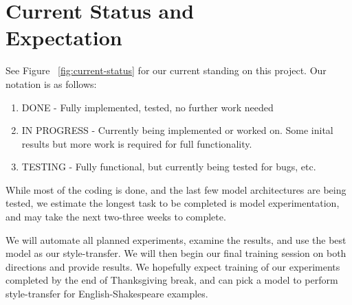 \documentclass[twoside,twocolumn]{article}
\begin{document}

\section{Current Status and\\Expectation}
See Figure ~\ref{fig:current-status} for our current standing on this project.
Our notation is as follows:
\begin{enumerate}
  \item DONE - Fully implemented, tested, no further work needed
  \item IN PROGRESS - Currently being implemented or worked on. Some inital results
    but more work is required for full functionality.
  \item TESTING - Fully functional, but currently being tested for bugs, etc.
\end{enumerate}

While most of the coding is done, and the last few model architectures are
being tested, we estimate the longest task to be completed is model
experimentation, and may take the next two-three weeks to complete.

We will automate all planned experiments, examine the results, and use the best
model as our style-transfer. We will then begin our final training session
on both directions and provide results. We hopefully expect training of our
experiments completed by the end of Thanksgiving break, and can pick a model
to perform style-transfer for English-Shakespeare examples.









\clearpage
\appendix
\onecolumn
\end{document}
